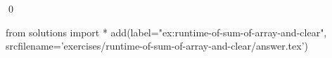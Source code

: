 \begin{ex}
  \label{ex:runtime-of-sum-of-array-and-clear}
  
\mbox{}\\ \\
\qed
\end{ex}
\begin{python0}
from solutions import *
add(label="ex:runtime-of-sum-of-array-and-clear",
    srcfilename='exercises/runtime-of-sum-of-array-and-clear/answer.tex') 
\end{python0}                              
